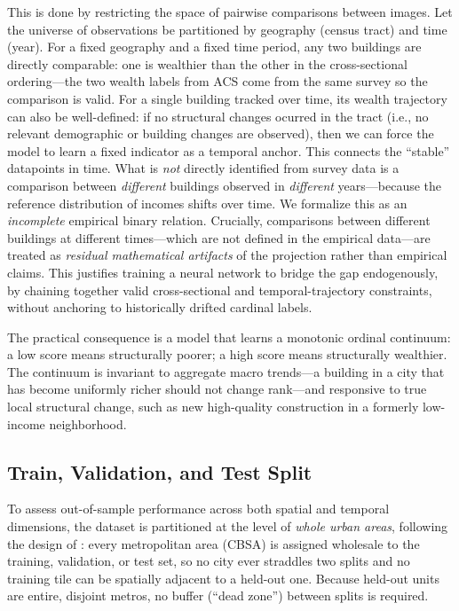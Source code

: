 \documentclass[conference]{IEEEtran}
\begin{document}
This is done by restricting the space of pairwise comparisons between images. Let the universe of observations be partitioned by geography (census tract) and time (year). For a fixed geography and a fixed time period, any two buildings are directly comparable: one is wealthier than the other in the cross-sectional ordering---the two wealth labels from ACS come from the same survey so the comparison is valid. For a single building tracked over time, its wealth trajectory can also be well-defined: if no structural changes ocurred in the tract (i.e., no relevant demographic or building changes are observed), then we can force the model to learn a fixed indicator as a temporal anchor. This connects the ``stable'' datapoints in time. What is \emph{not} directly identified from survey data is a comparison between \emph{different} buildings observed in \emph{different} years—because the reference distribution of incomes shifts over time. We formalize this as an \emph{incomplete} empirical binary relation. Crucially, comparisons between different buildings at different times—which are not defined in the empirical data—are treated as \emph{residual mathematical artifacts} of the projection rather than empirical claims. This justifies training a neural network to bridge the gap endogenously, by chaining together valid cross-sectional and temporal-trajectory constraints, without anchoring to historically drifted cardinal labels.

The practical consequence is a model that learns a monotonic ordinal continuum: a low score means structurally poorer; a high score means structurally wealthier. The continuum is invariant to aggregate macro trends—a building in a city that has become uniformly richer should not change rank—and responsive to true local structural change, such as new high-quality construction in a formerly low-income neighborhood.

\subsection{Train, Validation, and Test Split}
\label{sec:splits}

To assess out-of-sample performance across both spatial and temporal dimensions, the dataset is partitioned at the level of \emph{whole urban areas}, following the design of \citet{kachiyian2022}: every metropolitan area (CBSA) is assigned wholesale to the training, validation, or test set, so no city ever straddles two splits and no training tile can be spatially adjacent to a held-out one. Because held-out units are entire, disjoint metros, no buffer (``dead zone'') between splits is required.
\end{document}
